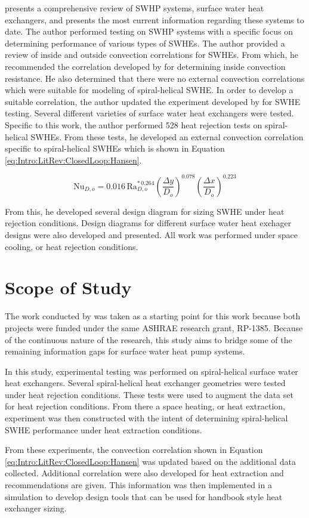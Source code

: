 \cite{Hansen2011} presents a comprehensive review of SWHP systems, surface water heat exchangers, and presents the most current information regarding these systems to date. The author performed testing on SWHP systems with a specific focus on determining performance of various types of SWHEs. The author provided a review of inside and outside convection correlations for SWHEs. From which, he recommended the correlation developed by \cite{RogersMayhew1964} for determining inside convection resistance. He also determined that there were no external convection correlations which were suitable for modeling of spiral-helical SWHE. In order to develop a suitable correlation, the author updated the experiment developed by \cite{Austin1998} for SWHE testing. Several different varieties of surface water heat exchangers were tested. Specific to this work, the author \citep{Hansen2011} performed 528 heat rejection tests on spiral-helical SWHEs. From these tests, he developed an external convection correlation specific to spiral-helical SWHEs which is shown in Equation \ref{eq:Intro:LitRev:ClosedLoop:Hansen}.

	\begin{equation}
		\mbox{Nu}_{D,o} = 0.016 \, \mbox{Ra}_{D,o}^{* \, 0.264} \left(\frac{\Delta y}{D_o}\right)^{0.078} \left(\frac{\Delta x}{D_o}\right)^{0.223}
		\label{eq:Intro:LitRev:ClosedLoop:Hansen}
	\end{equation}
	
From this, he developed several design diagram for sizing SWHE under heat rejection conditions. Design diagrams for different surface water heat exchager designs were also developed and presented. All work was performed under space cooling, or heat rejection conditions.

\section{Scope of Study}
\label{sec:Intro:Scope}

The work conducted by \cite{Hansen2011} was taken as a starting point for this work because both projects were funded under the same ASHRAE research grant, RP-1385. Because of the continuous nature of the research, this study aims to bridge some of the remaining information gaps for surface water heat pump systems. 

In this study, experimental testing was performed on spiral-helical surface water heat exchangers. Several spiral-helical heat exchanger geometries were tested under heat rejection conditions. These tests were used to augment the \cite{Hansen2011} data set for heat rejection conditions. From there a space heating, or heat extraction, experiment was then constructed with the intent of determining spiral-helical SWHE performance under heat extraction conditions.

From these experiments, the convection correlation shown in Equation \ref{eq:Intro:LitRev:ClosedLoop:Hansen} was updated based on the additional data collected. Additional correlation were also developed for heat extraction and recommendations are given. This information was then implemented in a simulation to develop design tools that can be used for handbook style heat exchanger sizing.